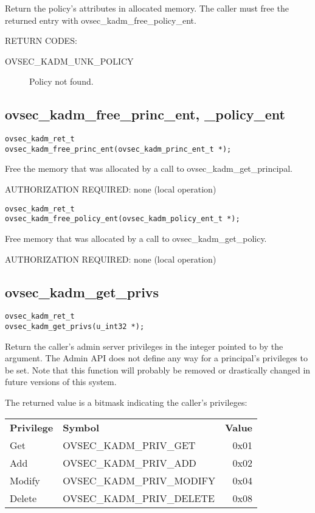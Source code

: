 Return the policy's attributes in allocated memory.  The caller must
free the returned entry with ovsec_kadm_free_policy_ent.

RETURN CODES: 

\begin{description}
\item[OVSEC_KADM_UNK_POLICY] Policy not found.
\end{description}

\subsection{ovsec_kadm_free_princ_ent, _policy_ent}

\begin{verbatim}
ovsec_kadm_ret_t
ovsec_kadm_free_princ_ent(ovsec_kadm_princ_ent_t *);
\end{verbatim}

Free the memory that was allocated by a call to
ovsec_kadm_get_principal. 

AUTHORIZATION REQUIRED: none (local operation)

\begin{verbatim}
ovsec_kadm_ret_t
ovsec_kadm_free_policy_ent(ovsec_kadm_policy_ent_t *);
\end{verbatim}

Free memory that was allocated by a call to ovsec_kadm_get_policy.

AUTHORIZATION REQUIRED: none (local operation)

\subsection{ovsec_kadm_get_privs}

\begin{verbatim}
ovsec_kadm_ret_t
ovsec_kadm_get_privs(u_int32 *);
\end{verbatim}

Return the caller's admin server privileges in the integer pointed to
by the argument.  The Admin API does not define any way for a
principal's privileges to be set.  Note that this function will
probably be removed or drastically changed in future versions of this
system.

The returned value is a bitmask indicating the caller's privileges:

\begin{tabular}{llr}
{\bf Privilege} & {\bf Symbol} & {\bf Value} \\
Get & OVSEC_KADM_PRIV_GET & 0x01 \\
Add & OVSEC_KADM_PRIV_ADD & 0x02 \\
Modify & OVSEC_KADM_PRIV_MODIFY & 0x04 \\
Delete & OVSEC_KADM_PRIV_DELETE & 0x08
\end{tabular}

